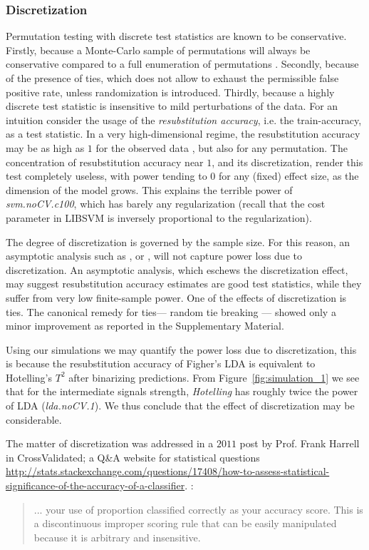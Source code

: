 \documentclass[]{bio}
\begin{document}
\subsubsection{Discretization}
Permutation testing with discrete test statistics are known to be conservative.
Firstly, because a Monte-Carlo sample of permutations will always be conservative compared to a full enumeration of permutations \citep{hemerik_exact_2014}.
Secondly, because of the presence of ties, which does not allow to exhaust the permissible false positive rate, unless randomization is introduced.
Thirdly, because a highly discrete test statistic is insensitive to mild perturbations of the data.
For an intuition consider the usage of the \emph{resubstitution accuracy}, i.e. the train-accuracy, as a test statistic. 
In a very high-dimensional regime, the resubstitution accuracy may be as high as $1$ for the observed data \cite[Theorem 1]{mclachlan_bias_1976}, but also for any permutation.
The concentration of resubstitution accuracy near $1$, and its discretization, render this test completely useless, with power tending to $0$ for any (fixed) effect size, as the dimension of the model grows. 
This explains the terrible power of \emph{svm.noCV.c100}, which has barely any regularization (recall that the cost parameter in LIBSVM is inversely proportional to the regularization). 

The degree of discretization is governed by the sample size. 
For this reason, an asymptotic analysis such as \cite{ramdas_classification_2016}, or \cite{golland_permutation_2005}, will not capture power loss due to discretization. 
An asymptotic analysis, which eschews the discretization effect,  may suggest resubstitution accuracy estimates are good test statistics, while they suffer from very low finite-sample power. 
One of the effects of discretization is ties. 
The canonical remedy for ties--- random tie breaking --- showed only a minor improvement as reported in the Supplementary Material.

Using our simulations we may quantify the power loss due to discretization, this is because the resubstitution accuracy of Figher's LDA is equivalent to Hotelling's $T^2$ after binarizing predictions. 
From Figure~\ref{fig:simulation_1} we see that for the intermediate signals strength, \emph{Hotelling} has roughly twice the power of LDA (\emph{lda.noCV.1}).
We thus conclude that the effect of discretization may be considerable. 


The matter of discretization was addressed in a $2011$ post by Prof. Frank Harrell in \textsf{CrossValidated}; a Q\&A website for statistical questions \url{http://stats.stackexchange.com/questions/17408/how-to-assess-statistical-significance-of-the-accuracy-of-a-classifier}. :
\begin{quote}
	... your use of proportion classified correctly as your accuracy score. This is a discontinuous improper scoring rule that can be easily manipulated because it is arbitrary and insensitive.
\end{quote}
\end{document}
